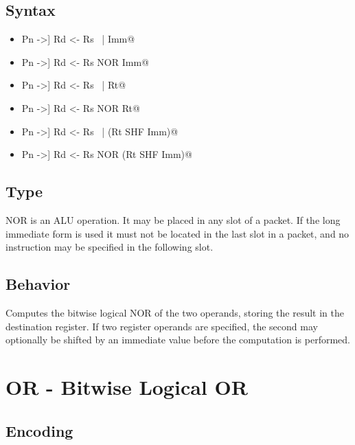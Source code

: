 \documentclass[11pt,openany]{report}
\begin{document}
\subsection{Syntax}

\begin{itemize}
  \item \verb@[[!]Pn ->] Rd <- Rs ~| Imm@
  \item \verb@[[!]Pn ->] Rd <- Rs NOR Imm@
  \item \verb@[[!]Pn ->] Rd <- Rs ~| Rt@
  \item \verb@[[!]Pn ->] Rd <- Rs NOR Rt@
  \item \verb@[[!]Pn ->] Rd <- Rs ~| (Rt SHF Imm)@
  \item \verb@[[!]Pn ->] Rd <- Rs NOR (Rt SHF Imm)@
\end{itemize}

\subsection{Type}
NOR is an ALU operation. It may be placed in any slot of a packet. If the long immediate form is used it must not be located in the last slot in a packet, and no instruction may be specified in the following slot.

\subsection{Behavior}
Computes the bitwise logical NOR of the two operands, storing the result in the destination register. If two register operands are specified, the second may optionally be shifted by an immediate value before the computation is performed.


\pagebreak
\section{OR - Bitwise Logical OR}
\label{sec:orinst}

\subsection{Encoding}
\end{document}
